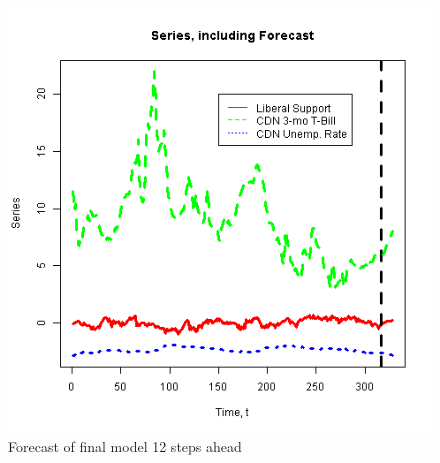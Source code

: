 \documentclass[article]{jss}
\begin{document}


\begin{figure}[H]
  \centering
  \includegraphics[scale = 1, keepaspectratio=true]{Figures/forecast_vars.png}
  \caption{Forecast of final model 12 steps ahead}
  \label{fig:forecast_vars}
\end{figure}
\end{document}

